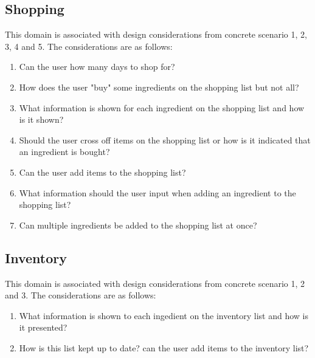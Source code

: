 \subsection{Shopping}
This domain is associated with design considerations from concrete scenario 1, 2, 3, 4 and 5. The considerations are as follows:

\begin{enumerate}
	\item Can the user how many days to shop for?
	\item How does the user "buy" some ingredients on the shopping list but not all?
	\item What information is shown for each ingredient on the shopping list and how is it shown?
	\item Should the user cross off items on the shopping list or how is it indicated that an ingredient is bought?
	\item Can the user add items to the shopping list?
	\item What information should the user input when adding an ingredient to the shopping list?
	\item Can multiple ingredients be added to the shopping list at once?   
\end{enumerate}


\subsection{Inventory}
This domain is associated with design considerations from concrete scenario 1, 2 and 3. The considerations are as follows:

\begin{enumerate}
	\item What information is shown to each ingedient on the inventory list and how is it presented? 
	\item How is this list kept up to date? can the user add items to the inventory list?
\end{enumerate}

